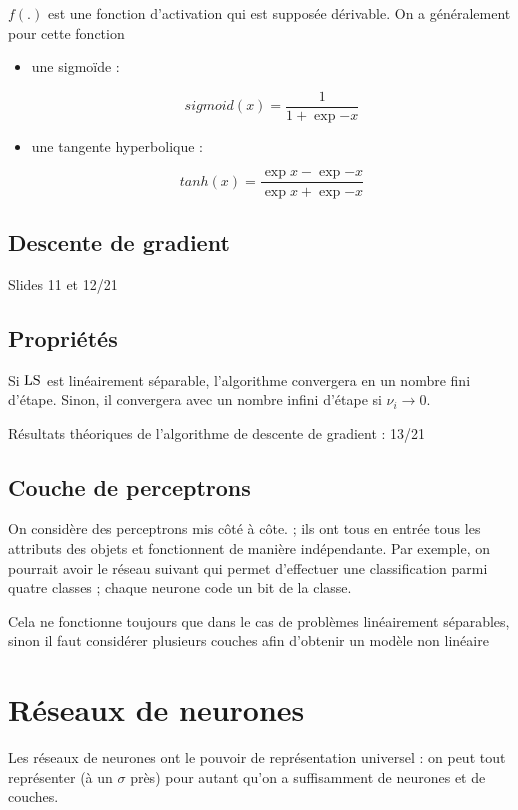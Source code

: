 	$f(.)$ est une fonction d'activation qui est supposée dérivable. On a généralement pour cette fonction
	
	\begin{itemize}
		\item une sigmoïde :
		
		$$sigmoid(x) = \frac{1}{1 + \exp{-x}}$$
		
		\item une tangente hyperbolique :
		
		$$tanh(x) = \frac{\exp{x} - \exp{-x}}{\exp{x} + \exp{-x}}$$
	\end{itemize}
	
	\subsection{Descente de gradient}
	
	Slides 11 et 12/21
	
	\subsection{Propriétés}
	
	Si $\text{LS}$ est linéairement séparable, l'algorithme convergera en un nombre fini d'étape. Sinon, il convergera avec un nombre infini d'étape si $\nu_i \rightarrow 0$.
	
	Résultats théoriques de l'algorithme de descente de gradient : 13/21
	
	\subsection{Couche de perceptrons}
	
	On considère des perceptrons mis côté à côte. ; ils ont tous en entrée tous les attributs des objets et fonctionnent de manière indépendante. Par exemple, on pourrait avoir le réseau suivant qui permet d'effectuer une classification parmi quatre classes ; chaque neurone code un bit de la classe.
	
	
	Cela ne fonctionne toujours que dans le cas de problèmes linéairement séparables, sinon il faut considérer plusieurs couches afin d'obtenir un modèle non linéaire

\section{Réseaux de neurones}

Les réseaux de neurones ont le pouvoir de représentation universel : on peut tout représenter (à un $\sigma$ près) pour autant qu'on a suffisamment de neurones et de couches.

